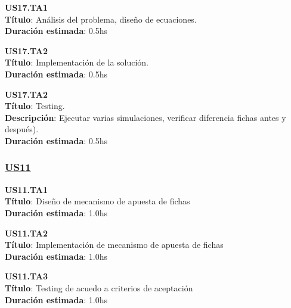 \begin{tcolorbox}
\textbf{US17.TA1} \\
\textbf{Título}: Análisis del problema, diseño de ecuaciones. \\
\textbf{Duración estimada}: 0.5hs
\end{tcolorbox}
\vspace{10pt}

\begin{tcolorbox}
\textbf{US17.TA2} \\
\textbf{Título}: Implementación de la solución. \\
\textbf{Duración estimada}: 0.5hs
\end{tcolorbox}
\vspace{10pt}


\begin{tcolorbox}
\textbf{US17.TA2} \\
\textbf{Título}: Testing. \\
\textbf{Descripción}: Ejecutar varias simulaciones, verificar diferencia fichas antes y después). \\
\textbf{Duración estimada}: 0.5hs 
\end{tcolorbox}
\vspace{10pt}


\subsubsection*{\underline{US11}}

\begin{tcolorbox}
\textbf{US11.TA1} \\
\textbf{Título}: Diseño de mecanismo de apuesta de fichas \\
\textbf{Duración estimada}: 1.0hs
\end{tcolorbox}
\vspace{10pt}


\begin{tcolorbox}
\textbf{US11.TA2} \\
\textbf{Título}: Implementación de mecanismo de apuesta de fichas \\
\textbf{Duración estimada}: 1.0hs
\end{tcolorbox}
\vspace{10pt}


\begin{tcolorbox}
\textbf{US11.TA3} \\
\textbf{Título}: Testing de acuedo a criterios de aceptación \\
\textbf{Duración estimada}: 1.0hs
\end{tcolorbox}
\vspace{10pt}



